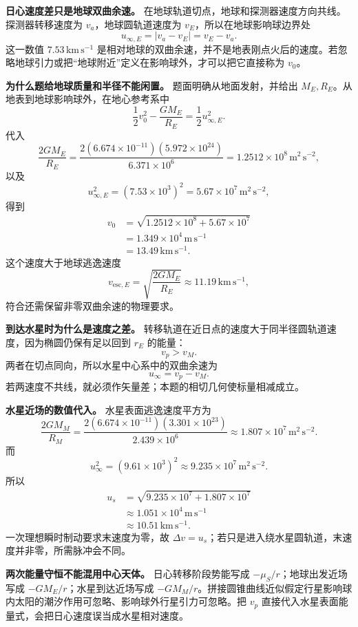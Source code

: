 \documentclass[12pt,a4paper,UTF8]{ctexart}
\begin{document}
\textbf{日心速度差只是地球双曲余速。}
在地球轨道切点，地球和探测器速度方向共线。探测器转移速度为
\(v_a\)，地球圆轨道速度为 \(v_E\)，所以在地球影响球边界处 \[
u_{\infty,E}=|v_a-v_E|=v_E-v_a.
\] 这一数值 \(7.53\,\mathrm{km\,s^{-1}}\)
是相对地球的双曲余速，并不是地表刚点火后的速度。若忽略地球引力或把``地球附近''定义在影响球外，才可以把它直接称为
\(v_0\)。

\textbf{为什么题给地球质量和半径不能闲置。} 题面明确从地面发射，并给出
\(M_E,R_E\)。从地表到地球影响球外，在地心参考系中 \[
\frac12v_0^2-\frac{GM_E}{R_E}
=\frac12u_{\infty,E}^2.
\] 代入 \[
\frac{2GM_E}{R_E}
=\frac{2(6.674\times10^{-11})(5.972\times10^{24})}
{6.371\times10^6}
=1.2512\times10^8\,\mathrm{m^2\,s^{-2}},
\] 以及 \[
u_{\infty,E}^2
=(7.53\times10^3)^2
=5.67\times10^7\,\mathrm{m^2\,s^{-2}},
\] 得到 \[
\begin{aligned}
v_0
&=\sqrt{1.2512\times10^8+5.67\times10^7}\\
&=1.349\times10^4\,\mathrm{m\,s^{-1}}\\
&=13.49\,\mathrm{km\,s^{-1}}.
\end{aligned}
\] 这个速度大于地球逃逸速度 \[
v_{\mathrm{esc},E}=\sqrt{\frac{2GM_E}{R_E}}
\approx11.19\,\mathrm{km\,s^{-1}},
\] 符合还需保留非零双曲余速的物理要求。

\textbf{到达水星时为什么是速度之差。}
转移轨道在近日点的速度大于同半径圆轨道速度，因为椭圆仍保有足以回到
\(r_E\) 的能量： \[
v_p>v_M.
\] 两者在切点同向，所以水星中心系中的双曲余速为 \[
u_\infty=v_p-v_M.
\] 若两速度不共线，就必须作矢量差；本题的相切几何使标量相减成立。

\textbf{水星近场的数值代入。} 水星表面逃逸速度平方为 \[
\frac{2GM_M}{R_M}
=\frac{2(6.674\times10^{-11})(3.301\times10^{23})}
{2.439\times10^6}
\approx1.807\times10^7\,\mathrm{m^2\,s^{-2}}.
\] 而 \[
u_\infty^2
=(9.61\times10^3)^2
\approx9.235\times10^7\,\mathrm{m^2\,s^{-2}}.
\] 所以 \[
\begin{aligned}
u_s
&=\sqrt{9.235\times10^7+1.807\times10^7}\\
&\approx1.051\times10^4\,\mathrm{m\,s^{-1}}\\
&\approx10.51\,\mathrm{km\,s^{-1}}.
\end{aligned}
\] 一次理想瞬时制动要求末速度为零，故
\(\Delta v=u_s\)；若只是进入绕水星圆轨道，末速度并非零，所需脉冲会不同。

\textbf{两次能量守恒不能混用中心天体。} 日心转移阶段势能写成
\(-\mu_S/r\)；地球出发近场写成 \(-GM_E/r\)；水星到达近场写成
\(-GM_M/r\)。拼接圆锥曲线近似假定行星影响球内太阳的潮汐作用可忽略、影响球外行星引力可忽略。把
\(v_p\) 直接代入水星表面能量式，会把日心速度误当成水星相对速度。
\end{document}
